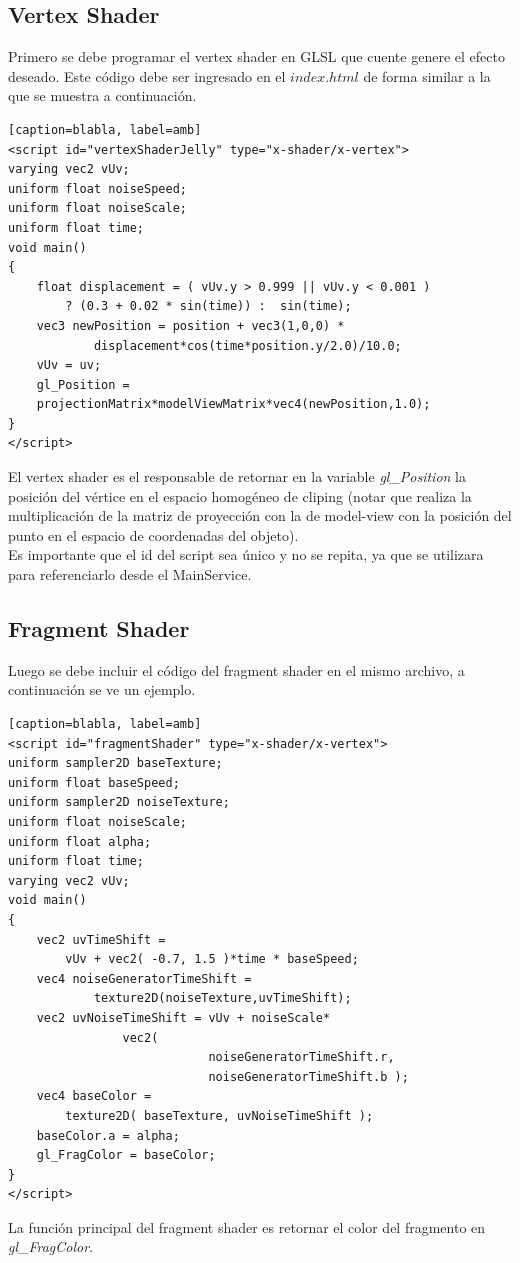 \documentclass[12pt]{article}
\begin{document}
\subsection{Vertex Shader}
Primero se debe programar el vertex shader en GLSL que cuente genere el efecto deseado. Este código debe ser ingresado en el $index.html$ de forma similar a la que se muestra a continuación.
\begin{lstlisting}[frame=single][caption=blabla, label=amb]
<script id="vertexShaderJelly" type="x-shader/x-vertex">
varying vec2 vUv;
uniform float noiseSpeed;
uniform float noiseScale;
uniform float time;
void main() 
{ 
	float displacement = ( vUv.y > 0.999 || vUv.y < 0.001 )
 		? (0.3 + 0.02 * sin(time)) :  sin(time);
    vec3 newPosition = position + vec3(1,0,0) * 
    		displacement*cos(time*position.y/2.0)/10.0;
    vUv = uv;
    gl_Position = 
	projectionMatrix*modelViewMatrix*vec4(newPosition,1.0);
}
</script>
\end{lstlisting}
El vertex shader es el responsable de retornar en la variable \textit{gl\_Position} la posición del vértice en el espacio homogéneo de cliping (notar que realiza la multiplicación de la matriz de proyección con la de model-view con la posición del punto en el espacio de coordenadas del objeto).
\\Es importante que el id del script sea único y no se repita, ya que se utilizara para referenciarlo desde el MainService.
\clearpage
\subsection{Fragment Shader}
Luego se debe incluir el código del fragment shader en el mismo archivo, a continuación se ve un ejemplo.
\begin{lstlisting}[frame=single][caption=blabla, label=amb]
<script id="fragmentShader" type="x-shader/x-vertex"> 
uniform sampler2D baseTexture;
uniform float baseSpeed;
uniform sampler2D noiseTexture;
uniform float noiseScale;
uniform float alpha;
uniform float time;
varying vec2 vUv;
void main() 
{
	vec2 uvTimeShift = 
		vUv + vec2( -0.7, 1.5 )*time * baseSpeed;	
	vec4 noiseGeneratorTimeShift = 
			texture2D(noiseTexture,uvTimeShift);
	vec2 uvNoiseTimeShift = vUv + noiseScale*
    			vec2(
                    		noiseGeneratorTimeShift.r, 
                    		noiseGeneratorTimeShift.b );
	vec4 baseColor = 
		texture2D( baseTexture, uvNoiseTimeShift );
	baseColor.a = alpha;
	gl_FragColor = baseColor;
}  
</script>
\end{lstlisting}
La función principal del fragment shader es retornar el color del fragmento en \textit{gl\_FragColor}.
\end{document}
